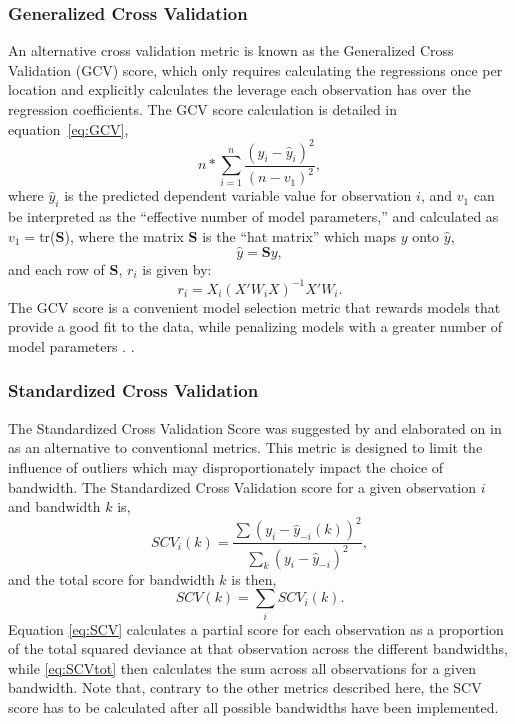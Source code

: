 \documentclass{article}\usepackage[]{graphicx}\usepackage[]{color}
\begin{document}
\subsubsection{Generalized Cross Validation}
An alternative cross validation metric is known as the Generalized Cross Validation (GCV) score, which only requires calculating the regressions once per location and explicitly calculates the leverage each observation has over the regression coefficients. The GCV score calculation is detailed in equation~\eqref{eq:GCV},
\begin{equation}\label{eq:GCV}
n*\sum_{i=1}^{n}\frac{(y_i-\hat{y}_i)^2}{(n-v_1)^2}, 
\end{equation} 
where $\hat{y}_i$ is the predicted dependent variable value for observation $i$, and $v_1$ can be interpreted as the ``effective number of model parameters,'' and calculated as $v_1=$tr(\textbf{S}), where the matrix \textbf{S} is the ``hat matrix'' which maps $y$ onto $\hat{y}$,
                   \begin{equation}
                   \hat{y}=\textbf{S}y,
                   \end{equation}
                   and each row of \textbf{S}, $r_i$ is given by:
                  \begin{equation}
                   r_i=X_i(X'W_iX)^{-1}X'W_i.
                   \end{equation}
The GCV score is a convenient model selection metric that rewards models that provide a good fit to the data, while penalizing models with a greater number of model parameters \citep{Loader1999, McMillen2010}.  \citep{Paez2011, McMillen2010, McMillen2012}. 

\subsubsection{Standardized Cross Validation}
The Standardized Cross Validation Score was suggested by \citep{Farber2007b} and elaborated on in \citep{Paez2011} as an alternative to conventional metrics. This metric is designed to limit the influence of outliers which may disproportionately impact the choice of bandwidth. The Standardized Cross Validation score for a given observation $i$ and bandwidth $k$ is, 
\begin{equation}\label{eq:SCV}
SCV_i (k) = \frac{\sum (y_i - \hat{y}_{-i}(k))^2} {\sum _k (y_i - \hat{y}_{-i})^2 },
\end{equation}
and the total score for bandwidth $k$ is then,
\begin{equation}\label{eq:SCVtot}
SCV(k) = \sum _i SCV_i(k).
\end{equation}
Equation \eqref{eq:SCV} calculates a partial score for each observation as a proportion of the total squared deviance at that observation across the different bandwidths, while \eqref{eq:SCVtot} then calculates the sum across all observations for a given bandwidth. Note that, contrary to the other metrics described here, the SCV score has to be calculated after all possible bandwidths have been implemented.
\end{document}
